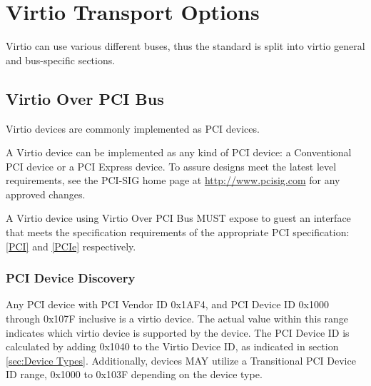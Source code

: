 \chapter{Virtio Transport Options}\label{sec:Virtio Transport Options}

Virtio can use various different buses, thus the standard is split
into virtio general and bus-specific sections.

\section{Virtio Over PCI Bus}\label{sec:Virtio Transport Options / Virtio Over PCI Bus}

Virtio devices are commonly implemented as PCI devices.

A Virtio device can be implemented as any kind of PCI device:
a Conventional PCI device or a PCI Express
device.  To assure designs meet the latest level
requirements, see 
the PCI-SIG home page at \url{http://www.pcisig.com} for any
approved changes.

A Virtio device using Virtio Over PCI Bus MUST expose to
guest an interface that meets the specification requirements of
the appropriate PCI specification: \hyperref[intro:PCI]{[PCI]}
and \hyperref[intro:PCIe]{[PCIe]}
respectively. 

\subsection{PCI Device Discovery}\label{sec:Virtio Transport Options / Virtio Over PCI Bus / PCI Device Discovery}

Any PCI device with PCI Vendor ID 0x1AF4, and PCI Device ID 0x1000 through
0x107F inclusive is a virtio device. The actual value within this range
indicates which virtio device is supported by the device.
The PCI Device ID is calculated by adding 0x1040 to the Virtio Device ID,
as indicated in section \ref{sec:Device Types}.
Additionally, devices MAY utilize a Transitional PCI Device ID range,
0x1000 to 0x103F depending on the device type.


